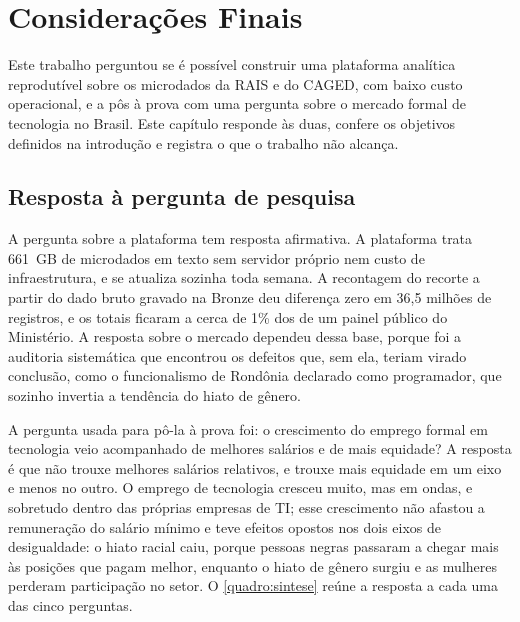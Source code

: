 
\chapter{Considerações Finais}
\label{cap:consideracoes}

Este trabalho perguntou se é possível construir uma plataforma analítica reprodutível sobre os microdados da RAIS e do CAGED, com baixo custo operacional, e a pôs à prova com uma pergunta sobre o mercado formal de tecnologia no Brasil. Este capítulo responde às duas, confere os objetivos definidos na introdução e registra o que o trabalho não alcança.

\section{Resposta à pergunta de pesquisa}

A pergunta sobre a plataforma tem resposta afirmativa. A plataforma trata 661~GB de microdados em texto sem servidor próprio nem custo de infraestrutura, e se atualiza sozinha toda semana. A recontagem do recorte a partir do dado bruto gravado na Bronze deu diferença zero em 36,5 milhões de registros, e os totais ficaram a cerca de 1\% dos de um painel público do Ministério. A resposta sobre o mercado dependeu dessa base, porque foi a auditoria sistemática que encontrou os defeitos que, sem ela, teriam virado conclusão, como o funcionalismo de Rondônia declarado como programador, que sozinho invertia a tendência do hiato de gênero.

A pergunta usada para pô-la à prova foi: o crescimento do emprego formal em tecnologia veio acompanhado de melhores salários e de mais equidade? A resposta é que não trouxe melhores salários relativos, e trouxe mais equidade em um eixo e menos no outro. O emprego de tecnologia cresceu muito, mas em ondas, e sobretudo dentro das próprias empresas de TI; esse crescimento não afastou a remuneração do salário mínimo e teve efeitos opostos nos dois eixos de desigualdade: o hiato racial caiu, porque pessoas negras passaram a chegar mais às posições que pagam melhor, enquanto o hiato de gênero surgiu e as mulheres perderam participação no setor. O \autoref{quadro:sintese} reúne a resposta a cada uma das cinco perguntas.

